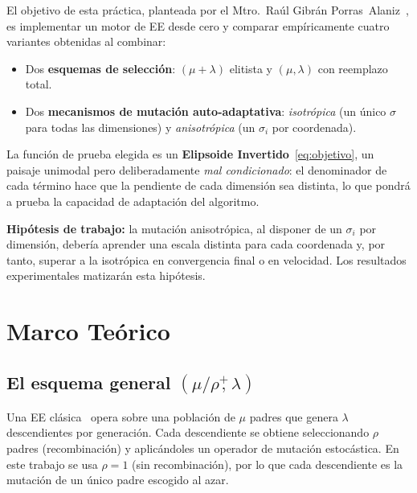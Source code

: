 \documentclass[12pt,letterpaper]{article}
\begin{document}
El objetivo de esta práctica, planteada por el Mtro.~Raúl Gibrán Porras~Alaniz~\cite{porras2026ee}, es implementar un motor de EE desde cero y comparar empíricamente cuatro variantes obtenidas al combinar:

\begin{itemize}[leftmargin=2.2em, itemsep=3pt]
    \item Dos \textbf{esquemas de selección}: $(\mu+\lambda)$ elitista y $(\mu,\lambda)$ con reemplazo total.
    \item Dos \textbf{mecanismos de mutación auto-adaptativa}: \emph{isotrópica} (un único $\sigma$ para todas las dimensiones) y \emph{anisotrópica} (un $\sigma_i$ por coordenada).
\end{itemize}

La función de prueba elegida es un \textbf{Elipsoide Invertido}~\eqref{eq:objetivo}, un paisaje unimodal pero deliberadamente \textit{mal condicionado}: el denominador de cada término hace que la pendiente de cada dimensión sea distinta, lo que pondrá a prueba la capacidad de adaptación del algoritmo.

\begin{notebox}
\textbf{Hipótesis de trabajo:} la mutación anisotrópica, al disponer de un $\sigma_i$ por dimensión, debería aprender una escala distinta para cada coordenada y, por tanto, superar a la isotrópica en convergencia final o en velocidad. Los resultados experimentales matizarán esta hipótesis.
\end{notebox}

\newpage
\section{Marco Teórico}

\subsection{El esquema general \texorpdfstring{$(\mu/\rho \stackrel{+}{,} \lambda)$}{(mu/rho +/, lambda)}}

Una EE clásica~\cite{beyer2002} opera sobre una población de $\mu$ padres que genera $\lambda$ descendientes por generación. Cada descendiente se obtiene seleccionando $\rho$ padres (recombinación) y aplicándoles un operador de mutación estocástica. En este trabajo se usa $\rho=1$ (sin recombinación), por lo que cada descendiente es la mutación de un único padre escogido al azar.
\end{document}
